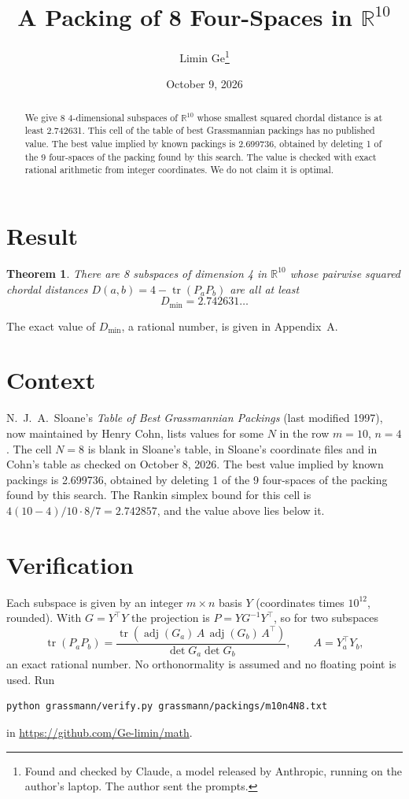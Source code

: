 \documentclass[11pt,a4paper]{article}
\title{A Packing of 8 Four-Spaces in $\mathbb{R}^{10}$}
\author{Limin Ge\thanks{Found and checked by Claude, a model released by Anthropic, running on the author's laptop. The author sent the prompts.}}
\date{October 9, 2026}
\newtheorem*{theorem}{Theorem}
\begin{document}
\maketitle
\begin{abstract}
We give 8 4-dimensional subspaces of $\mathbb{R}^{10}$ whose smallest squared chordal distance is at least 2.742631. This cell of the table of best Grassmannian packings has no published value. The best value implied by known packings is 2.699736, obtained by deleting 1 of the 9 four-spaces of the packing found by this search. The value is checked with exact rational arithmetic from integer coordinates. We do not claim it is optimal.
\end{abstract}

\section{Result}
\begin{theorem}
There are 8 subspaces of dimension 4 in $\mathbb{R}^{10}$ whose pairwise squared chordal distances $D(a,b) = 4 - \operatorname{tr}(P_aP_b)$ are all at least
\[ D_{\min} = 2.742631\ldots \]
\end{theorem}
The exact value of $D_{\min}$, a rational number, is given in Appendix~A.


\section{Context}
N.~J.~A.~Sloane's \emph{Table of Best Grassmannian Packings} (last modified 1997), now maintained by Henry Cohn, lists values for some $N$ in the row $m=10$, $n=4$. The cell $N=8$ is blank in Sloane's table, in Sloane's coordinate files and in Cohn's table as checked on October 8, 2026. The best value implied by known packings is 2.699736, obtained by deleting 1 of the 9 four-spaces of the packing found by this search. The Rankin simplex bound for this cell is $4(10-4)/10\cdot 8/7 = 2.742857$, and the value above lies below it.


\section{Verification}
Each subspace is given by an integer $m\times n$ basis $Y$ (coordinates times $10^{12}$, rounded). With $G=Y^\top Y$ the projection is $P=YG^{-1}Y^\top$, so for two subspaces
\[ \operatorname{tr}(P_aP_b)=\frac{\operatorname{tr}(\operatorname{adj}(G_a)\,A\,\operatorname{adj}(G_b)\,A^\top)}{\det G_a\det G_b},\qquad A=Y_a^\top Y_b, \]
an exact rational number. No orthonormality is assumed and no floating point is used. Run
\begin{verbatim}
python grassmann/verify.py grassmann/packings/m10n4N8.txt
\end{verbatim}
in \url{https://github.com/Ge-limin/math}.
\end{document}
